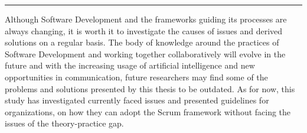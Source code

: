\par\noindent\rule{\textwidth}{0.4pt}

Although Software Development and the \glspl{framework} guiding its processes are always changing, it is worth it to investigate the causes of issues and derived solutions on a regular basis. The body of knowledge around the practices of Software Development and working together collaboratively will evolve in the future and with the increasing usage of artificial intelligence and new opportunities in communication, future researchers may find some of the problems and solutions presented by this thesis to be outdated. As for now, this study has investigated currently faced issues and presented \glspl{guideline} for organizations, on how they can adopt the Scrum \gls{framework} without facing the issues of the theory-practice gap.
